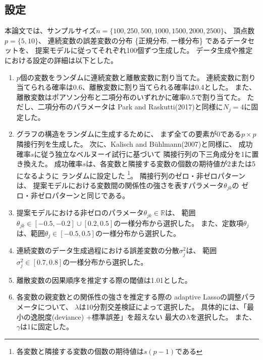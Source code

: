 
\subsection{設定}
\label{subsection:setup}

本論文では、サンプルサイズ$n = \{ 100, 250, 500, 1000, 1500, 2000, 2500 \}$、
頂点数$p = \{ 5, 10 \}$、
連続変数の誤差変数の分布 \{正規分布, 一様分布\} であるデータセットを、
提案モデルに従ってそれぞれ100個ずつ生成した。
データ生成や推定における設定の詳細は以下とした。

\begin{enumerate}
  \setlength{\itemsep}{0.3cm}
  \item
  $p$個の変数をランダムに連続変数と離散変数に割り当てた。
  連続変数に割り当てられる確率は0.6、離散変数に割り当てられる確率は0.4とした。
  また、離散変数はポアソン分布と二項分布のいずれかに確率0.5で割り当てた。
  ただし、二項分布のパラメータは
  Park and Raskutti(2017)\cite{Park2017-hw}と同様に$N_j=4$に固定した。

  \item
  グラフの構造をランダムに生成するために、
  まず全ての要素が0である$p\times p$隣接行列を生成した。
  次に、Kalisch and B\"{u}hlmann(2007)\cite{Kalisch2007-xg}と同様に、
  成功確率$s$に従う独立なベルヌーイ試行に基づいて
  隣接行列の下三角成分を1に置き換えた。
  成功確率$s$は、各変数と隣接する変数の個数の期待値が2または5になるように
  ランダムに設定した
  \footnote{各変数と隣接する変数の個数の期待値は$s(p-1)$である\cite{Kalisch2007-xg}}。
  隣接行列のゼロ・非ゼロパターンは、
  提案モデルにおける変数間の関係性の強さを表すパラメータ$\theta_{jk}$の
  ゼロ・非ゼロパターンと同じである。

  \item
  提案モデルにおける非ゼロのパラメータ$\theta_{jk} \in \mathbb R$は、
  範囲$\theta_{jk} \in [-0.5,-0.2]\cup [0.2,0.5]$の一様分布から選択した。
  また、定数項$\theta_j$は、範囲$\theta_j \in [-0.5,0.5]$の一様分布から選択した。

  \item
  連続変数のデータ生成過程における誤差変数の分散$\sigma_j^2$は、
  範囲$\sigma_j^2 \in [0.7,0.8]$の一様分布から選択した。

  \item
  離散変数の因果順序を推定する際の閾値は1.01とした。

  \item
  各変数の親変数との関係性の強さを推定する際の
  adaptive Lassoの調整パラメータについて、
  $\lambda$は10分割交差検証によって選択した。
  具体的には、「最小の逸脱度(deviance) +標準誤差」を超えない
  最大の$\lambda$を選択した。
  また、$\gamma$は1に固定した。
\end{enumerate}

